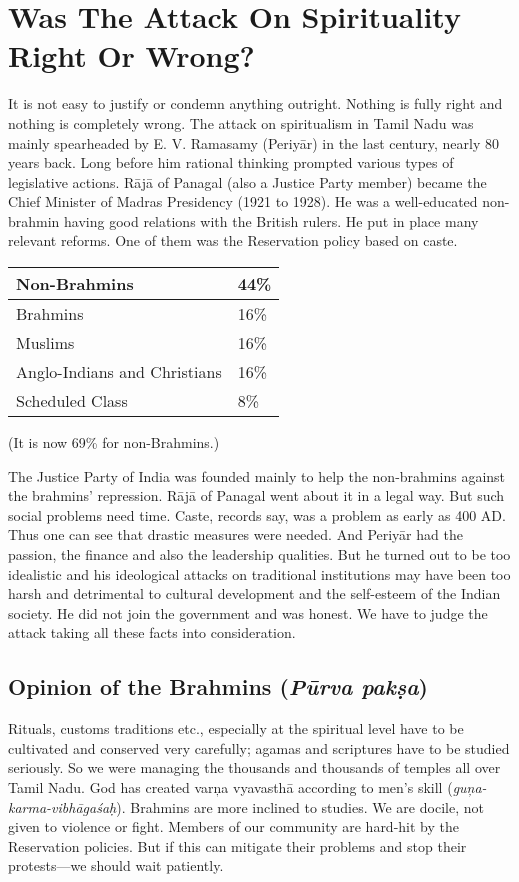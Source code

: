 \section*{Was The Attack On Spirituality Right Or Wrong?}

It is not easy to justify or condemn anything outright. Nothing is fully right and nothing is completely wrong. The attack on spiritualism in Tamil Nadu was mainly spearheaded by E. V. Ramasamy (Periyār) in the last century, nearly 80 years back. Long before him rational thinking prompted various types of legislative actions. Rājā of Panagal (also a Justice Party member) became the Chief Minister of Madras Presidency (1921 to 1928). He was a well-educated non-brahmin having good relations with the British rulers. He put in place many relevant reforms. One of them was the Reservation policy based on caste.

\begin{longtable}{@{}|l|l|@{}}
\hline
Non-Brahmins & 44\% \\
\hline
Brahmins & 16\% \\
\hline
Muslims & 16\% \\
\hline
Anglo-Indians and Christians & 16\% \\
\hline
Scheduled Class & 8\% \\
\hline
\end{longtable}

(It is now 69\% for non-Brahmins.)

The Justice Party of India was founded mainly to help the non-brahmins against the brahmins’ repression. Rājā of Panagal went about it in a legal way. But such social problems need time. Caste, records say, was a problem as early as 400 AD. Thus one can see that drastic measures were needed. And Periyār had the passion, the finance and also the leadership qualities. But he turned out to be too idealistic and his ideological attacks on traditional institutions may have been too harsh and detrimental to cultural development and the self-esteem of the Indian society. He did not join the government and was honest. We have to judge the attack taking all these facts into consideration.

\subsection*{Opinion of the Brahmins (\textit{Pūrva pakṣa})}

Rituals, customs traditions etc., especially at the spiritual level have to be cultivated and conserved very carefully; agamas and scriptures have to be studied seriously. So we were managing the thousands and thousands of temples all over Tamil Nadu. God has created varņa vyavasthā according to men’s skill (\textit{guņa-karma-vibhāgaśaḥ}). Brahmins are more inclined to studies. We are docile, not given to violence or fight. Members of our community are hard-hit by the Reservation policies. But if this can mitigate their problems and stop their protests—we should wait patiently.


